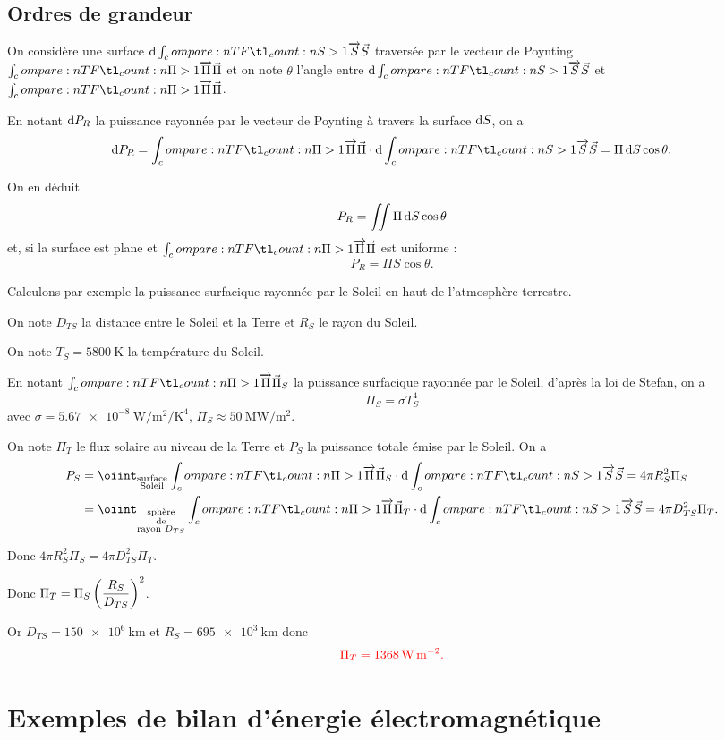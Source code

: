 \subsection{Ordres de grandeur}

On considère une surface \(\odif{\v{S}}\) traversée par le vecteur de Poynting \(\v{\Pi}\) et on note \(\theta\) l'angle entre \(\odif{\v{S}}\) et \(\v{\Pi}\).

En notant \(\odif{P_R}\) la puissance rayonnée par le vecteur de Poynting à travers la surface \(\odif{S}\), on a \[\odif{P_R}=\v{\Pi}\scal\odif{\v{S}}=\Pi\odif{S}\cos\theta.\]

On en déduit \[P_R=\iint\Pi\odif{S}\cos\theta\] et, si la surface est plane et \(\v{\Pi}\) est uniforme : \[P_R=\Pi S\cos\theta.\]

Calculons par exemple la puissance surfacique rayonnée par le Soleil en haut de l'atmosphère terrestre.

On note \(D_{TS}\) la distance entre le Soleil et la Terre et \(R_S\) le rayon du Soleil.

On note \(T_S=\SI{5800}{\kelvin}\) la température du Soleil.

En notant \(\v{\Pi}_S\) la puissance surfacique rayonnée par le Soleil, d'après la loi de Stefan, on a \[\Pi_S=\sigma T_S^4\] avec \(\sigma=\SI{5.67e-8}{\watt\per\metre\squared\per\kelvin\tothe{4}}\), \ie \(\Pi_S\approx\SI{50}{\mega\watt\per\metre\squared}\).

On note \(\Pi_T\) le flux solaire au niveau de la Terre et \(P_S\) la puissance totale émise par le Soleil. On a \[\begin{aligned}
P_S&=\oiint_{\substack{\text{surface} \\ \text{Soleil}}}\v{\Pi}_S\scal\odif{\v{S}}=4\pi R_S^2\Pi_S \\
&=\oiint_{\substack{\text{sphère} \\ \text{de} \\ \text{rayon }D_{TS}}}\v{\Pi}_T\scal\odif{\v{S}}=4\pi D_{TS}^2\Pi_T.
\end{aligned}\]

Donc \(4\pi R_S^2\Pi_S=4\pi D_{TS}^2\Pi_T\).

Donc \(\Pi_T=\Pi_S\left(\dfrac{R_S}{D_{TS}}\right)^2\).

Or \(D_{TS}=\SI{150e6}{\kilo\metre}\) et \(R_S=\SI{695e3}{\kilo\metre}\) donc \[\color{red}\Pi_T=\SI{1368}{\watt\per\metre\squared}.\]

\section{Exemples de bilan d'énergie électromagnétique}

